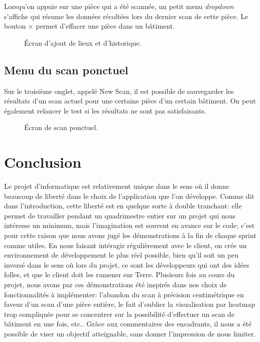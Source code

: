 \documentclass{elsarticle}
\begin{document}
Lorsqu'on appuie sur une pièce qui a été scannée, un petit menu \textit{dropdown} s'affiche qui résume les données récoltées lors du dernier scan de cette pièce.
Le bouton \og $\times$ \fg{} permet d'effacer une pièce dans un bâtiment.

\begin{figure}[!htbp]
	\centering
	\caption{Écran d'ajout de lieux et d'historique.}
	\label{fig:places}
\end{figure}

\subsection{Menu du scan ponctuel}
Sur le troisième onglet, appelé \textsf{New Scan}, il est possible de sauvegarder les résultats d'un scan actuel pour une certaine pièce d'un certain bâtiment.
On peut également relancer le test si les résultats ne sont pas satisfaisants.

\begin{figure}[!htbp]
	\centering
	\caption{Écran de scan ponctuel.}
	\label{fig:newscan}
\end{figure}

\section{Conclusion}
Le projet d'informatique est relativement unique dans le sens où il donne beaucoup de liberté dans le choix de l'application que l'on développe.
Comme dit dans l'introduction, cette liberté est en quelque sorte à double tranchant: elle permet de travailler pendant un quadrimestre entier sur un projet qui nous intéresse un minimum, mais l'imagination est souvent en avance sur le code; c'est pour cette raison que nous avons jugé les démonstrations à la fin de chaque sprint comme utiles.
En nous faisant intéragir régulièrement avec le \og client\fg, on crée un environnement de développement le plus réel possible, bien qu'il soit un peu inversé dans le sens où lors du projet, ce sont les développeurs qui ont des idées folles, et que le client doit les ramener sur Terre.
Plusieurs fois au cours du projet, nous avons par ces démonstrations été inspirés dans nos choix de fonctionnalités à implémenter: l'abandon du scan à précision centimétrique en faveur d'un scan d'une pièce entière, le fait d'oublier la visualisation par heatmap trop compliquée pour se concentrer sur la possibilité d'effectuer un scan de bâtiment en une fois, etc..
Grâce aux commentaires des encadrants, il nous a été possible de viser un objectif atteignable, sans donner l'impression de nous limiter.
\end{document}

